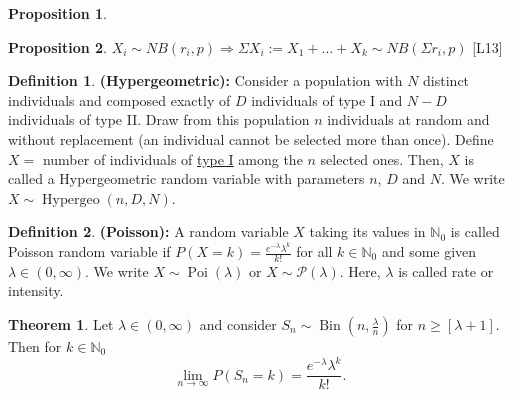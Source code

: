 \documentclass[11pt]{article}
\theoremstyle{definition}
\DeclareMathOperator{\Bin}{Bin}
\DeclareMathOperator{\Poi}{Poi}
\DeclareMathOperator{\Hype}{Hypergeo}
\newtheorem{thm}{Theorem}
\newtheorem{prop}{Proposition}
\newtheorem{defn}{Definition}
\begin{document}
\begin{prop}

\end{prop}

\begin{prop}
$X_i\sim NB(r_i,p) \Rightarrow \Sigma X_i := X_1+...+X_k\sim NB(\Sigma r_i , p)$ [L13]
\end{prop}
\begin{defn}\textbf{(Hypergeometric):}
Consider a population with $N$ distinct individuals and composed exactly of $D$ individuals of type I and $N-D$ individuals of type II. Draw from this population $n$ individuals at random and without replacement (an individual cannot be selected more than once). Define $X=$ number of individuals of \underline{type I} among the $n$ selected ones. Then, $X$ is called a Hypergeometric random variable with parameters $n$, $D$ and $N$. We write $X\sim \Hype (n,D,N)$.
\end{defn}
\begin{defn}\textbf{(Poisson):}
A random variable $X$ taking its values in $\mathbb{N}_0$ is called Poisson random variable if $P(X=k)=\frac{e^{-\lambda}\lambda^k}{k!}$ for all $k \in \mathbb{N}_0$ and some given $\lambda\in(0,\infty)$. We write $X\sim\Poi(\lambda)$ or $X\sim\mathcal{P}(\lambda)$. Here, $\lambda$ is called rate or intensity.
\end{defn}

\begin{thm}
Let $\lambda\in(0,\infty)$ and consider $S_n\sim\Bin(n,\frac{\lambda}{n})$ for $n\geq [\lambda+1]$. Then for $k\in\mathbb{N}_0$
\[\lim_{n\rightarrow\infty}P(S_n=k)=\frac{e^{-\lambda}\lambda^k}{k!}.\]
\end{thm}
\end{document}
